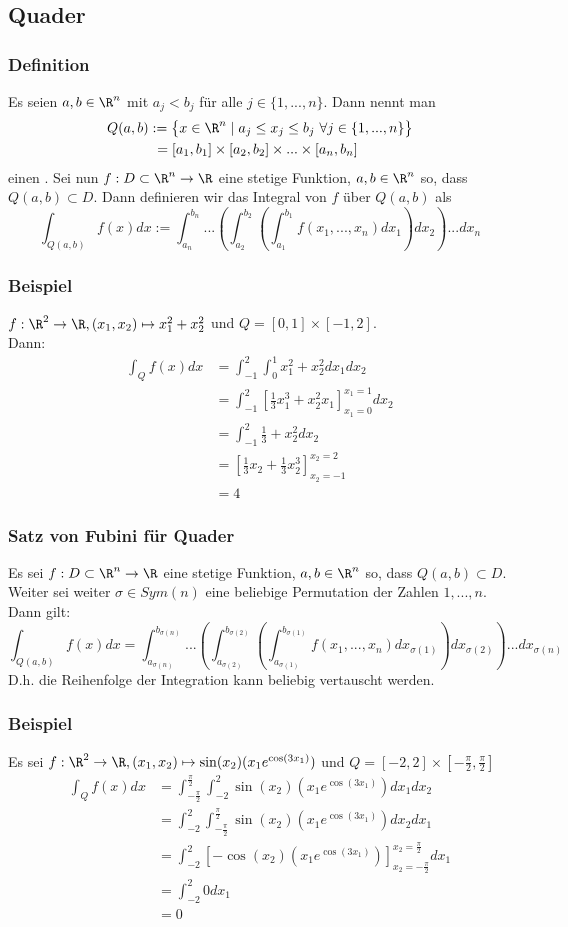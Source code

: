 \subsection{Quader}
%
%
\begin{frame}\frametitle{Definition}
Es seien $a, b \in \R^n$ mit $a_j < b_j$ für alle $j \in \{1,...,n\}$. Dann nennt man 
\begin{align*}
Q(a,b)&:= \big\{x \in \R^n \mid a_j \le x_j \le b_j\ \forall j \in \{1,...,n\} \big\}\\
&\ =[a_1,b_1] \times [a_2,b_2] \times ... \times [a_n,b_n]
\end{align*}
einen .\pause \vfill
Sei nun $f: D \subset \R^n \to \R$ eine stetige Funktion, $a,b \in \R^n$ so, dass $Q(a,b) \subset D$. Dann definieren wir das Integral von $f$ über $Q(a,b)$ als
$$
\int_{Q(a,b)} f(x) dx := \int_{a_n}^{b_n}...\left(\int_{a_2}^{b_2}\left(\int_{a_1}^{b_1} f(x_1,...,x_n) dx_1\right)dx_2\right)...dx_n
$$
\end{frame}
%
%
\begin{frame}\frametitle{Beispiel}
$f: \R^2 \to \R, (x_1,x_2) \mapsto x_1^2+x_2^2$ und $Q=[0,1]\times[-1,2]$.\\
Dann:\pause
\begin{align*}
\int_Q f(x)dx&=\int_{-1}^2 \int_0^1 x_1^2+x_2^2 dx_1dx_2\\
&=\int_{-1}^2 \left[\frac{1}{3}x_1^3+x_2^2x_1\right]_{x_1=0}^{x_1=1} dx_2\\
&=\int_{-1}^2 \frac{1}{3}+x_2^2 dx_2\\
&=\left[ \frac{1}{3}x_2+\frac{1}{3}x_2^3\right]_{x_2=-1}^{x_2=2}\\
&=4
\end{align*}
\end{frame}
%
%
\begin{frame}\frametitle{Satz von Fubini für Quader}
Es sei $f: D \subset \R^n \to \R$ eine stetige Funktion, $a,b \in \R^n$ so, dass $Q(a,b) \subset D$. Weiter sei weiter $\sigma \in Sym(n)$ eine beliebige Permutation der Zahlen $1,...,n$.\\
 Dann gilt:
\small
$$
\int_{Q(a,b)}f(x)dx=\int_{a_{\sigma(n)}}^{b_{\sigma(n)}}...\left(\int_{a_{\sigma(2)}}^{b_{\sigma(2)}}\left(\int_{a_{\sigma(1)}}^{b_{\sigma(1)}} f(x_1,...,x_n) dx_{\sigma(1)}\right)dx_{\sigma(2)}\right)...dx_{\sigma(n)}
$$	
\textnormal
D.h. die Reihenfolge der Integration kann beliebig vertauscht werden.	
\end{frame}
%
%
\begin{frame}\frametitle{Beispiel}
Es sei $f: \R^2 \to \R, (x_1,x_2) \mapsto \sin(x_2)(x_1e^{\cos(3x_1)})$ und $Q=[-2,2]\times[-\frac{\pi}{2},\frac{\pi}{2}]$ \pause
\begin{align*}
\int_Q f(x)dx&= \int_{-\frac{\pi}{2}}^{\frac{\pi}{2}}\int_{-2}^2\sin(x_2)(x_1e^{\cos(3x_1)}) dx_1dx_2\\
&=\int_{-2}^2 \int_{-\frac{\pi}{2}}^{\frac{\pi}{2}}\sin(x_2)(x_1e^{\cos(3x_1)}) dx_2dx_1\\
&=\int_{-2}^2  \left[ -\cos(x_2) (x_1e^{\cos(3x_1)})\right]_{x_2=-\frac{\pi}{2}}^{x_2=\frac{\pi}{2}}dx_1\\
&=\int_{-2}^2 0 dx_1\\
&=0
\end{align*}	
\end{frame}

